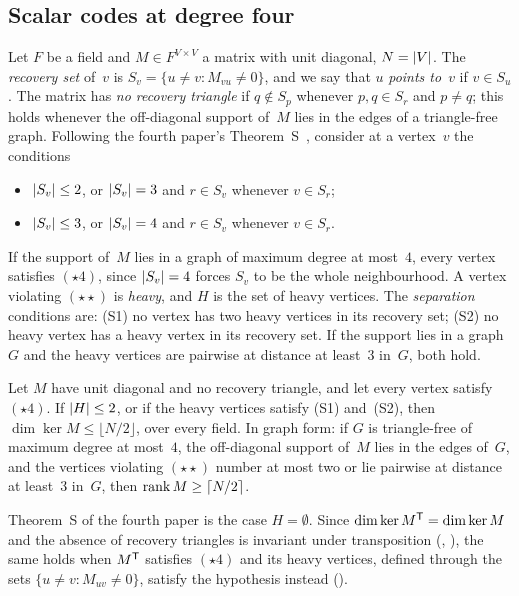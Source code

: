 \subsection{Scalar codes at degree four}\label{sec:crux-deg4}

Let $F$ be a field and $M\in F^{V\times V}$ a matrix with unit diagonal, $N=\lvert V \rvert$. The \emph{recovery set} of~$v$ is
$S_v=\{u\ne v:M_{vu}\ne0\}$, and we say that $u$ \emph{points to}~$v$ if $v\in S_u$. The matrix has \emph{no recovery triangle}
if $q\notin S_p$ whenever $p,q\in S_r$ and $p\ne q$; this holds whenever the off-diagonal support of~$M$ lies in the edges of a
triangle-free graph. Following the fourth paper's Theorem~S~\cite[Theorem~6.13]{FourthPaper2026}, consider at a vertex~$v$ the
conditions
\begin{itemize}[leftmargin=3em]
\item[$(\star\star)$] $\lvert S_v \rvert\le2$, or $\lvert S_v \rvert=3$ and $r\in S_v$ whenever $v\in S_r$;
\item[$(\star4)$] $\lvert S_v \rvert\le3$, or $\lvert S_v \rvert=4$ and $r\in S_v$ whenever $v\in S_r$.
\end{itemize}
If the support of~$M$ lies in a graph of maximum degree at most~$4$, every vertex satisfies $(\star4)$, since
$\lvert S_v \rvert=4$ forces $S_v$ to be the whole neighbourhood. A vertex violating $(\star\star)$ is \emph{heavy}, and $H$ is the set
of heavy vertices. The \emph{separation} conditions are: (S1) no vertex has two heavy vertices in its recovery set; (S2) no
heavy vertex has a heavy vertex in its recovery set. If the support lies in a graph~$G$ and the heavy vertices are pairwise at
distance at least~$3$ in~$G$, both hold.

\begin{theorem}\label{thm:SH}
Let $M$ have unit diagonal and no recovery triangle, and let every vertex satisfy $(\star4)$. If $\lvert H \rvert\le2$, or if the heavy
vertices satisfy (S1) and~(S2), then $\dim\ker M\le\lfloor N/2\rfloor$, over every field. In graph form: if $G$ is triangle-free
of maximum degree at most~$4$, the off-diagonal support of~$M$ lies in the edges of~$G$, and the vertices violating
$(\star\star)$ number at most two or lie pairwise at distance at least~$3$ in~$G$, then $\operatorname{rank} M\ge\lceil N/2\rceil$.
\end{theorem}

Theorem~S of the fourth paper is the case $H=\emptyset$. Since $\dim\ker M^{\mathsf{T}}=\dim\ker M$ and the absence of recovery
triangles is invariant under transposition (, ), the same holds
when $M^{\mathsf{T}}$ satisfies $(\star4)$ and its heavy vertices, defined through the sets $\{u\ne v:M_{uv}\ne0\}$, satisfy the
hypothesis instead ().

